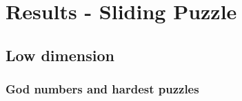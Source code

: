 
\chapter{Results - Sliding Puzzle} %

\label{sec:ResultsSP} %


\section{Low dimension}
\label{sec:SPLowDimension}

\subsection{God numbers and hardest puzzles}


